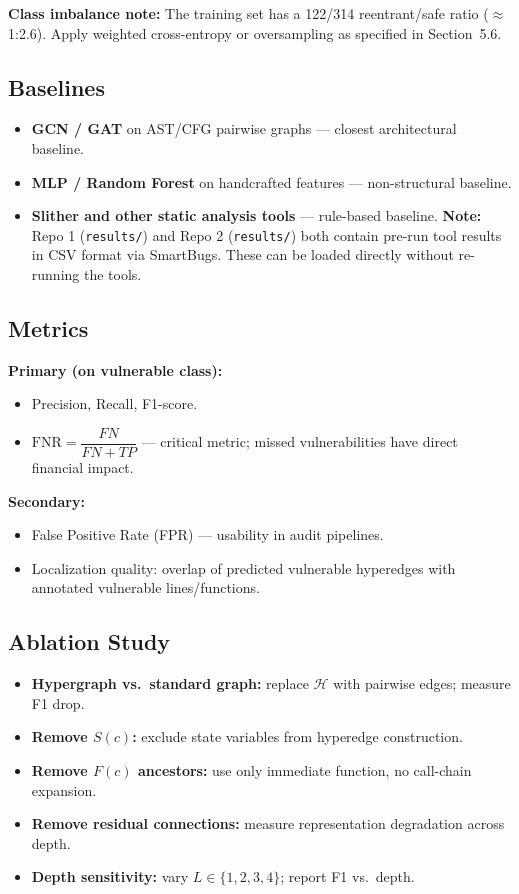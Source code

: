 \documentclass[11pt]{article}
\begin{document}
\textbf{Class imbalance note:} The training set has a 122/314 reentrant/safe ratio ($\approx$1:2.6). Apply weighted cross-entropy or oversampling as specified in Section~5.6.

\subsection{Baselines}

\begin{itemize}
    \item \textbf{GCN / GAT} on AST/CFG pairwise graphs --- closest architectural baseline.
    \item \textbf{MLP / Random Forest} on handcrafted features --- non-structural baseline.
    \item \textbf{Slither and other static analysis tools} --- rule-based baseline. \textbf{Note:} Repo 1 (\texttt{results/}) and Repo 2 (\texttt{results/}) both contain pre-run tool results in CSV format via SmartBugs. These can be loaded directly without re-running the tools.
\end{itemize}

\subsection{Metrics}

\textbf{Primary (on vulnerable class):}
\begin{itemize}
    \item Precision, Recall, F1-score.
    \item $\text{FNR} = \dfrac{FN}{FN + TP}$ --- critical metric; missed vulnerabilities have direct financial impact.
\end{itemize}

\textbf{Secondary:}
\begin{itemize}
    \item False Positive Rate (FPR) --- usability in audit pipelines.
    \item Localization quality: overlap of predicted vulnerable hyperedges with annotated vulnerable lines/functions.
\end{itemize}

\subsection{Ablation Study}

\begin{itemize}
    \item \textbf{Hypergraph vs.\ standard graph:} replace $\mathcal{H}$ with pairwise edges; measure F1 drop.
    \item \textbf{Remove $S(c)$:} exclude state variables from hyperedge construction.
    \item \textbf{Remove $F(c)$ ancestors:} use only immediate function, no call-chain expansion.
    \item \textbf{Remove residual connections:} measure representation degradation across depth.
    \item \textbf{Depth sensitivity:} vary $L \in \{1, 2, 3, 4\}$; report F1 vs.\ depth.
\end{itemize}
\end{document}
